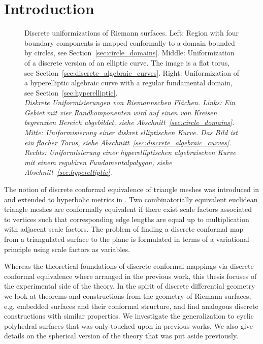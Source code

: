 \documentclass[Thesis.tex]{subfiles}
\begin{document}
\chapter{Introduction}

\begin{figure}
\centering
{}
\caption{
Discrete uniformizations of Riemann surfaces. 
Left: Region with four boundary components is mapped conformally to a domain bounded by circles, see Section~\ref{sec:circle_domains}. 
Middle: Uniformization of a discrete version of an elliptic curve. The image is a flat torus, see Section~\ref{sec:discrete_algebraic_curves}. 
Right: Uniformization of a hyperelliptic algebraic curve with a regular fundamental domain, see Section~\ref{sec:hyperelliptic}.\\
\it Diskrete Uniformisierungen von Riemannschen Fl\"{a}chen. 
Links: Ein Gebiet mit vier Randkomponenten wird auf einen von Kreisen begrenzten Bereich abgebildet, siehe Abschnitt~\ref{sec:circle_domains}.
Mitte: Uniformisierung einer diskret elliptischen Kurve. Das Bild ist ein flacher Torus, siehe Abschnitt~\ref{sec:discrete_algebraic_curves}.
Rechts: Uniformisierung einer hyperelliptischen algebraischen Kurve mit einem regul\"{a}ren Fundamentalpolygon, siehe Abschnitt~\ref{sec:hyperelliptic}.
}
\label{fig:intro_uniformizations} 
\end{figure}

The notion of discrete conformal equivalence of triangle meshes was introduced in \cite{Springborn2008} and extended to hyperbolic metrics in \cite{Bobenko2010}. 
Two combinatorially equivalent euclidean triangle meshes are conformally equivalent if there exist scale factors associated to vertices such that corresponding edge lengths are equal up to multiplication with adjacent scale factors.
The problem of finding a discrete conformal map from a triangulated surface to the plane is formulated in terms of a variational principle using scale factors as variables.

Whereas the theoretical foundations of discrete conformal mappings via discrete conformal equivalence where arranged in the previous work, this thesis focuses of the experimental side of the theory. 
In the spirit of discrete differential geometry we look at theorems and constructions from the geometry of Riemann surfaces, e.g. embedded surfaces and their conformal structure, and find analogous discrete constructions with similar properties.
We investigate the generalization to cyclic polyhedral surfaces that was only touched upon in previous works.
We also give details on the spherical version of the theory that was put aside previously.
\end{document}
